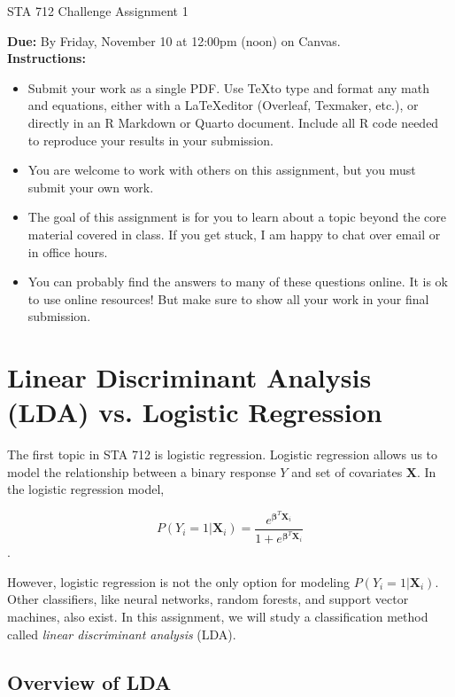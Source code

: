 \documentclass[11pt]{article}
\begin{document}
\begin{center}
\Large
STA 712 Challenge Assignment 1\\
\normalsize
\vspace{5mm}
\end{center}

\noindent \textbf{Due:} By Friday, November 10 at 12:00pm (noon) on Canvas.\\

\noindent \textbf{Instructions:} 
\begin{itemize}
\item Submit your work as a single PDF. Use \TeX to type and format any math and equations, either with a \LaTeX editor (Overleaf, Texmaker, etc.), or directly in an R Markdown or Quarto document. Include all R code needed to reproduce your results in your submission.
\item You are welcome to work with others on this assignment, but you must submit your own work.
\item The goal of this assignment is for you to learn about a topic beyond the core material covered in class. If you get stuck, I am happy to chat over email or in office hours.
\item You can probably find the answers to many of these questions online. It is ok to use online resources! But make sure to show all your work in your final submission.
\end{itemize}

\section*{Linear Discriminant Analysis (LDA) vs. Logistic Regression}

The first topic in STA 712 is logistic regression. Logistic regression allows us to model the relationship between a binary response $Y$ and set of covariates $\bm{X}$. In the logistic regression model,

$$P(Y_i = 1 | \bm{X}_i) = \dfrac{e^{\bm{\beta}^T \bm{X}_i}}{1 + e^{\bm{\beta}^T \bm{X}_i}}$$.

\noindent However, logistic regression is not the only option for modeling $P(Y_i = 1 | \bm{X}_i)$. Other classifiers, like neural networks, random forests, and support vector machines, also exist. In this assignment, we will study a classification method called \textit{linear discriminant analysis} (LDA).

\subsection*{Overview of LDA}
\end{document}
